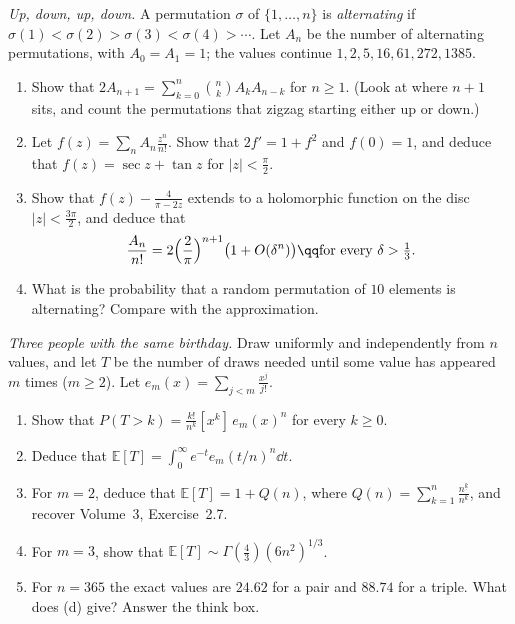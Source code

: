 \begin{exercise}[$\star\star\star$]\label{pb:zigzag}
\emph{Up, down, up, down.} A permutation $\sigma$ of $\{1,\dots,n\}$ is \emph{alternating} if $\sigma(1)<\sigma(2)>\sigma(3)<\sigma(4)>\cdots$. Let $A_n$ be the number of
alternating permutations, with $A_0=A_1=1$; the values continue $1,2,5,16,61,272,1385$.
\begin{enumerate}[label=(\alph*)]
\item Show that $2A_{n+1}=\sum_{k=0}^n\binom nkA_kA_{n-k}$ for $n\ge1$. (Look at where $n+1$ sits, and count the permutations that zigzag starting either up or down.)
\item Let $f(z)=\sum_nA_n\frac{z^n}{n!}$. Show that $2f'=1+f^2$ and $f(0)=1$, and deduce that $f(z)=\sec z+\tan z$ for $|z|<\frac\pi2$.
\item Show that $f(z)-\frac4{\pi-2z}$ extends to a holomorphic function on the disc $|z|<\frac{3\pi}2$, and deduce that
\[
\frac{A_n}{n!}=2\Bigl(\frac2\pi\Bigr)^{n+1}\bigl(1+O(\delta^n)\bigr)\qq\text{for every }\delta>\tfrac13.
\]
\item What is the probability that a random permutation of $10$ elements is alternating? Compare with the approximation.
\end{enumerate}
\end{exercise}

\begin{exercise}[$\star\star$]\label{pb:poissonise}
\emph{Three people with the same birthday.} Draw uniformly and independently from $n$ values, and let $T$ be the number of draws needed
until some value has appeared $m$ times ($m\ge2$). Let $e_m(x)=\sum_{j<m}\frac{x^j}{j!}$.
\begin{enumerate}[label=(\alph*)]
\item Show that $P(T>k)=\frac{k!}{n^k}[x^k]\,e_m(x)^n$ for every $k\ge0$.
\item Deduce that $\mathbb E[T]=\int_0^\infty e^{-t}e_m(t/n)^n\dd t$.
\item For $m=2$, deduce that $\mathbb E[T]=1+Q(n)$, where $Q(n)=\sum_{k=1}^n\frac{n^{\underline k}}{n^k}$, and recover Volume~3, Exercise~2.7.
\item For $m=3$, show that $\mathbb E[T]\sim\Gamma(\frac43)(6n^2)^{1/3}$.
\item For $n=365$ the exact values are $24.62$ for a pair and $88.74$ for a triple. What does (d) give? Answer the think box.
\end{enumerate}
\end{exercise}


